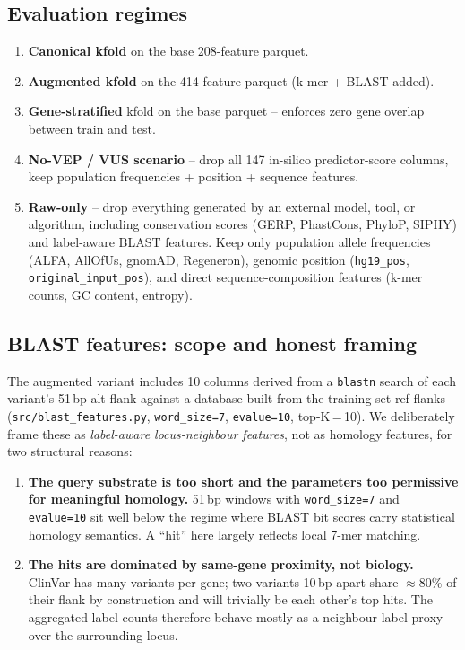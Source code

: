 \documentclass[11pt,a4paper]{article}
\begin{document}
\subsection{Evaluation regimes}

\begin{enumerate}[leftmargin=*]
    \item \textbf{Canonical kfold} on the base 208-feature parquet.
    \item \textbf{Augmented kfold} on the 414-feature parquet (k-mer + BLAST added).
    \item \textbf{Gene-stratified} kfold on the base parquet -- enforces zero gene
          overlap between train and test.
    \item \textbf{No-VEP / VUS scenario} -- drop all 147 in-silico predictor-score
          columns, keep population frequencies + position + sequence features.
    \item \textbf{Raw-only} -- drop everything generated by an external model, tool,
          or algorithm, including conservation scores (GERP, PhastCons, PhyloP, SIPHY)
          and label-aware BLAST features. Keep only population allele frequencies
          (ALFA, AllOfUs, gnomAD, Regeneron), genomic position (\texttt{hg19\_pos},
          \texttt{original\_input\_pos}), and direct sequence-composition features
          (k-mer counts, GC content, entropy).
\end{enumerate}

\subsection{BLAST features: scope and honest framing}
\label{sec:blast-caveat}

The augmented variant includes 10 columns derived from a \texttt{blastn}
search of each variant's 51\,bp alt-flank against a database built from the
training-set ref-flanks (\texttt{src/blast\_features.py}, \texttt{word\_size=7},
\texttt{evalue=10}, top-K\,=\,10). We deliberately frame these as
\emph{label-aware locus-neighbour features}, not as homology features, for
two structural reasons:

\begin{enumerate}[leftmargin=*]
    \item \textbf{The query substrate is too short and the parameters too
          permissive for meaningful homology.} 51\,bp windows with
          \texttt{word\_size=7} and \texttt{evalue=10} sit well below the
          regime where BLAST bit scores carry statistical homology semantics.
          A ``hit'' here largely reflects local 7-mer matching.
    \item \textbf{The hits are dominated by same-gene proximity, not biology.}
          ClinVar has many variants per gene; two variants 10\,bp apart share
          $\approx 80\%$ of their flank by construction and will trivially be
          each other's top hits. The aggregated label counts therefore
          behave mostly as a neighbour-label proxy over the surrounding locus.
\end{enumerate}
\end{document}
